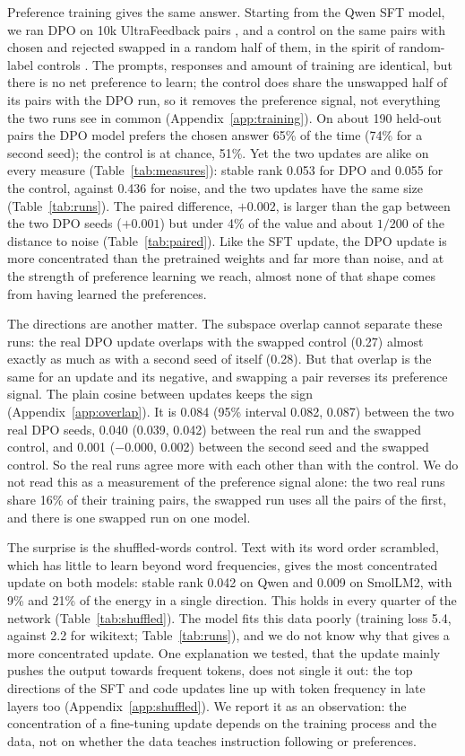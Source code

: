 Preference training gives the same answer. Starting from the Qwen SFT model,
we ran DPO \citep{rafailov2023dpo} on 10k UltraFeedback pairs
\citep{cui2024ultrafeedback}, and a control on the same pairs with chosen and
rejected swapped in a random half of them, in the spirit of random-label
controls \citep{zhang2017rethinking}. The prompts, responses and amount of
training are identical, but there is no net preference to learn; the control
does share the unswapped half of its pairs with the DPO run, so it removes the
preference signal, not everything the two runs see in common
(Appendix~\ref{app:training}). On about 190 held-out pairs the DPO model
prefers the chosen answer 65\% of the time (74\% for a second seed); the
control is at chance, 51\%. Yet the two updates are alike on every measure
(Table~\ref{tab:measures}): stable rank 0.053 for DPO and 0.055 for the
control, against 0.436 for noise, and the two updates have the same size
(Table~\ref{tab:runs}). The paired difference,
$+0.002$, is larger than the gap between the two DPO seeds ($+0.001$) but
under 4\% of the value and about $1/200$ of the distance to noise
(Table~\ref{tab:paired}). Like the SFT update, the DPO update is more
concentrated than the pretrained weights and far more than noise, and at the
strength of preference learning we reach, almost none of that shape comes from
having learned the preferences.

The directions are another matter. The subspace overlap cannot separate these
runs: the real DPO update overlaps with the swapped control (0.27) almost
exactly as much as with a second seed of itself (0.28). But that overlap is the
same for an update and its negative, and swapping a pair reverses its preference
signal. The plain cosine between updates keeps the sign
(Appendix~\ref{app:overlap}). It is 0.084 (95\% interval 0.082, 0.087) between
the two real DPO seeds, 0.040 (0.039, 0.042) between the real run and the swapped
control, and 0.001 ($-$0.000, 0.002) between the second seed and the swapped
control. So the real runs agree more with each other than with the control. We
do not read this as a measurement of the preference signal alone: the two real
runs share 16\% of their training pairs, the swapped run uses all the pairs of
the first, and there is one swapped run on one model.

The surprise is the shuffled-words control. Text with its word order
scrambled, which has little to learn beyond word frequencies, gives the most
concentrated update on both models: stable rank 0.042 on Qwen and 0.009 on
SmolLM2, with 9\% and 21\% of the energy in a single direction. This holds in
every quarter of the network (Table~\ref{tab:shuffled}). The model fits this
data poorly (training loss 5.4, against 2.2 for wikitext;
Table~\ref{tab:runs}), and we do not know why that gives a more concentrated
update. One explanation we tested, that the update mainly pushes the output
towards frequent tokens, does not single it out: the top directions of the
SFT and code updates line up with token frequency in late layers too
(Appendix~\ref{app:shuffled}). We report it as an observation: the
concentration of a fine-tuning update depends on the training process and the
data, not on whether the data teaches instruction following or preferences.

